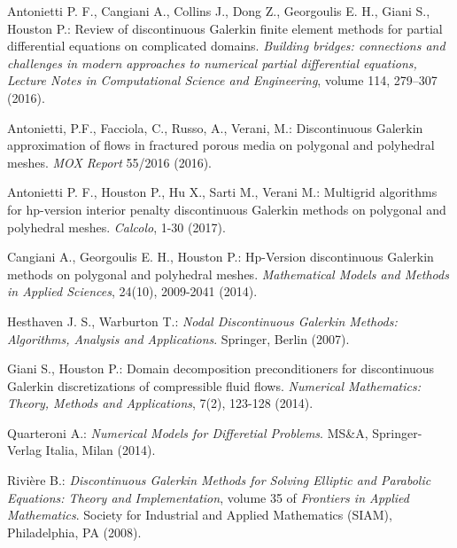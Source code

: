 \documentclass[12pt, a4paper]{article}
\begin{document}
\newpage
\begin{thebibliography}{9}
	Antonietti P. F., Cangiani  A., Collins J., Dong Z., Georgoulis E. H., Giani S., Houston P.: Review of discontinuous Galerkin finite element methods for partial differential equations on complicated domains. \emph{Building bridges: connections and challenges in modern approaches to numerical partial differential equations, Lecture Notes in Computational Science and Engineering}, volume 114, 279–307 (2016).
	
	Antonietti, P.F., Facciola, C., Russo, A., Verani, M.: Discontinuous Galerkin approximation of flows in fractured porous media on polygonal and polyhedral meshes. \emph{MOX Report} 55/2016 (2016).
	
	Antonietti P. F., Houston  P., Hu  X., Sarti  M., Verani M.: Multigrid algorithms for hp-version interior penalty discontinuous Galerkin methods on polygonal and	polyhedral meshes. \emph{Calcolo}, 1-30 (2017).
	
	Cangiani A., Georgoulis E. H., Houston P.: Hp-Version discontinuous Galerkin methods on polygonal and polyhedral meshes. \emph{Mathematical Models and Methods in Applied Sciences}, 24(10), 2009-2041 (2014).
	
	Hesthaven J. S., Warburton T.: \emph{Nodal Discontinuous Galerkin Methods: Algorithms, Analysis and Applications}. Springer, Berlin (2007).
	
	Giani S., Houston P.: Domain decomposition preconditioners for discontinuous Galerkin discretizations of compressible fluid flows. \emph{Numerical Mathematics: Theory, Methods and
	Applications}, 7(2), 123-128 (2014).
	
	Quarteroni A.: \emph{Numerical Models for Differetial Problems}. MS\&A, Springer-Verlag Italia, Milan (2014).
	
	Rivière B.: \emph{Discontinuous Galerkin Methods for Solving Elliptic and Parabolic Equations: Theory and Implementation}, volume 35 of \emph{Frontiers in Applied Mathematics}. Society for Industrial and Applied Mathematics (SIAM), Philadelphia, PA (2008).
\end{thebibliography}
\end{document}
